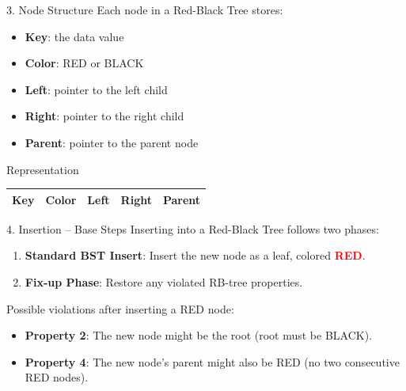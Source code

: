 \documentclass{beamer}
\begin{document}
\begin{frame}{3. Node Structure}
Each node in a Red-Black Tree stores:
\begin{itemize}
    \item \textbf{Key}: the data value
    \item \textbf{Color}: RED or BLACK
    \item \textbf{Left}: pointer to the left child
    \item \textbf{Right}: pointer to the right child
    \item \textbf{Parent}: pointer to the parent node
\end{itemize}

\begin{block}{Representation}
\begin{tabular}{|c|c|c|c|c|}
\hline
\textbf{Key} & \textbf{Color} & \textbf{Left} & \textbf{Right} & \textbf{Parent} \\
\hline
\end{tabular}
\end{block}
\end{frame}

\begin{frame}{4. Insertion -- Base Steps}
Inserting into a Red-Black Tree follows two phases:

\begin{enumerate}
    \item \textbf{Standard BST Insert}: Insert the new node as a leaf, colored \textcolor{red}{\textbf{RED}}.
    \item \textbf{Fix-up Phase}: Restore any violated RB-tree properties.
\end{enumerate}

\vspace{0.5em}
Possible violations after inserting a RED node:
\begin{itemize}
    \item \textbf{Property 2}: The new node might be the root (root must be BLACK).
    \item \textbf{Property 4}: The new node's parent might also be RED (no two consecutive RED nodes).
\end{itemize}
\end{frame}
\end{document}
